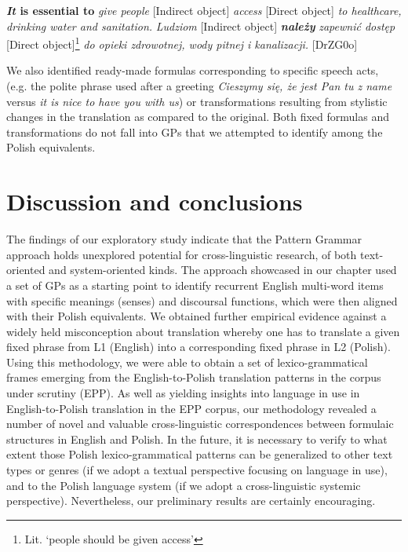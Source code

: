 \documentclass[output=paper]{langscibook}
\begin{document}
\ea \textbf{\textit{It} \textbf{is} \textbf{essential} \textbf{to}} \textit{give people} [Indirect object] \textit{access} [Direct object] \textit{to healthcare, drinking water and sanitation.} 
\ex\textit{Ludziom} [Indirect object] \textbf{\textit{należy}} \textit{zapewnić dostęp} [Direct object]\footnote{\textrm{Lit. ‘people should be given access’}} \textit{do opieki zdrowotnej, wody pitnej i kanalizacji.} [DrZG0o]
\z

We also identified ready-made formulas corresponding to specific speech acts, (e.g. the polite phrase used after a greeting \textit{Cieszymy się, że jest Pan tu z name} versus \textit{it is nice to have you with us}) or transformations resulting from stylistic changes in the translation as compared to the original. Both fixed formulas and transformations do not fall into GPs that we attempted to identify among the Polish equivalents.

\section{Discussion and conclusions}

The findings of our exploratory study indicate that the Pattern Grammar approach holds unexplored potential for cross-linguistic research, of both text-ori\-ent\-ed and system-oriented kinds. The approach showcased in our chapter used a set of GPs as a starting point to identify recurrent English multi-word items with specific meanings (senses) and discoursal functions, which were then aligned with their Polish equivalents. We obtained further empirical evidence against a widely held misconception about translation whereby one has to translate a given fixed phrase from L1 (English) into a corresponding fixed phrase in L2 (Polish). Using this methodology, we were able to obtain a set of lexico-grammatical frames emerging from the English-to-Polish translation patterns in the corpus under scrutiny (EPP). As well as yielding insights into language in use in English-to-Polish translation in the EPP corpus, our methodology revealed a number of novel and valuable cross-linguistic correspondences between formulaic structures in English and Polish. In the future, it is necessary to verify to what extent those Polish lexico-grammatical patterns can be generalized to other text types or genres (if we adopt a textual perspective focusing on language in use), and to the Polish language system (if we adopt a cross-linguistic systemic perspective). Nevertheless, our preliminary results are certainly encouraging. 
\end{document}
